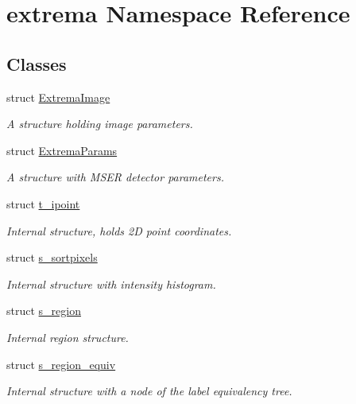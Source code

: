 \hypertarget{namespaceextrema}{
\section{extrema Namespace Reference}
\label{namespaceextrema}
}


\subsection*{Classes}
\begin{CompactItemize}
\item 
struct \hyperlink{structextrema_1_1ExtremaImage}{Extrema\-Image}
\begin{CompactList}\small\item\em A structure holding image parameters. \item\end{CompactList}\item 
struct \hyperlink{structextrema_1_1ExtremaParams}{Extrema\-Params}
\begin{CompactList}\small\item\em A structure with MSER detector parameters. \item\end{CompactList}\item 
struct \hyperlink{structextrema_1_1t__ipoint}{t\_\-ipoint}
\begin{CompactList}\small\item\em Internal structure, holds 2D point coordinates. \item\end{CompactList}\item 
struct \hyperlink{structextrema_1_1s__sortpixels}{s\_\-sortpixels}
\begin{CompactList}\small\item\em Internal structure with intensity histogram. \item\end{CompactList}\item 
struct \hyperlink{structextrema_1_1s__region}{s\_\-region}
\begin{CompactList}\small\item\em Internal region structure. \item\end{CompactList}\item 
struct \hyperlink{structextrema_1_1s__region__equiv}{s\_\-region\_\-equiv}
\begin{CompactList}\small\item\em Internal structure with a node of the label equivalency tree. \item\end{CompactList}\item 

\end{CompactItemize}
